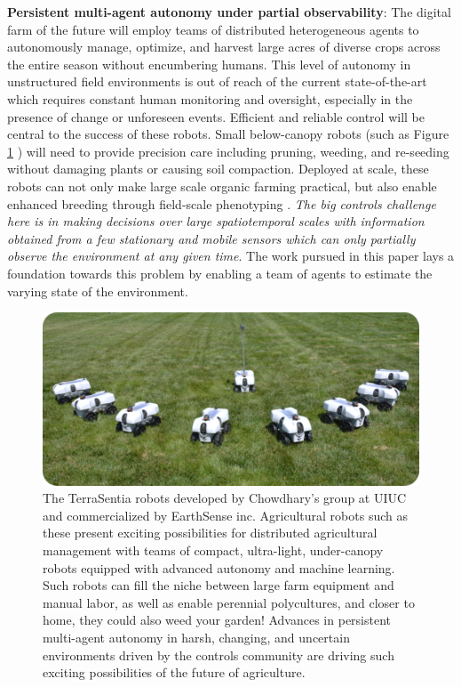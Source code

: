 \documentclass[letterpaper,12pt,peerreviewca,draftcls]{IEEEtran}
\begin{document}
\textbf{Persistent multi-agent autonomy under partial observability}:  The digital farm of the future will employ teams of distributed heterogeneous agents to autonomously manage, optimize, and harvest large acres of diverse crops across the entire season without encumbering humans. This level of autonomy in unstructured field environments is out of reach of the current state-of-the-art which requires constant human monitoring and oversight, especially in the presence of change or unforeseen events. Efficient and reliable control will be central to the success of these robots. Small below-canopy robots (such as Figure \ref{fig:terrasentia} \cite{kayacan2018embedded}) will need to provide precision care including pruning, weeding, and re-seeding without damaging plants or causing soil compaction. Deployed at scale, these robots can not only make large scale organic farming practical, but also enable enhanced breeding through  field-scale phenotyping \cite{kayacan2018embedded,mueller2017robotanist,virlet2017field}. \textit{The big controls challenge here is in making decisions over large spatiotemporal scales with information obtained from a few stationary and mobile sensors which can only partially observe the environment at any given time}. The work pursued in this paper lays a foundation towards this problem by enabling a team of agents to estimate the varying state of the environment. 

\begin{figure}
\includegraphics[width=\textwidth]{"Figure S1"}
\caption{The TerraSentia robots developed by Chowdhary's group at UIUC and commercialized by EarthSense inc. Agricultural robots such as these present exciting possibilities for distributed agricultural management with teams of compact, ultra-light, under-canopy robots equipped with advanced autonomy and machine learning. Such robots can fill the niche between large farm equipment and manual labor, as well as enable perennial polycultures, and closer to home,  they could also weed your garden! Advances in persistent multi-agent autonomy in harsh, changing, and uncertain environments driven by the controls community are driving such exciting possibilities of the future of agriculture.}
\label{fig:terrasentia}
\end{figure}
\end{document}
